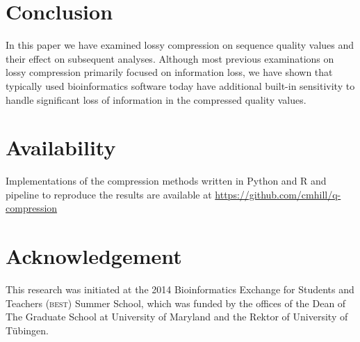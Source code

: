 \documentclass{bioinfo}
\begin{document}
\section{Conclusion}

In this paper we have examined lossy compression on sequence quality
values and their effect on subsequent analyses. Although most previous
examinations on lossy compression primarily focused on information
loss, we have shown that typically used bioinformatics software today
have additional built-in sensitivity to handle significant loss of
information in the compressed quality values.

\section{Availability}
Implementations of the compression methods written in Python and R and
pipeline to reproduce the results are available at
\url{https://github.com/cmhill/q-compression}

\section*{Acknowledgement}
This research was initiated at the 2014 Bioinformatics Exchange for
Students and Teachers (\textsc{best}) Summer School, which was funded
by the offices of the Dean of The Graduate School at University of
Maryland and the Rektor of University of T\"{u}bingen.






%

%


\end{document}
